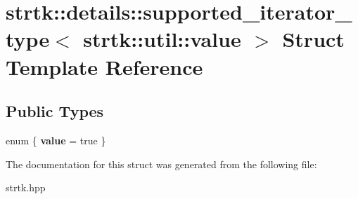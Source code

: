 \hypertarget{structstrtk_1_1details_1_1supported__iterator__type_3_01strtk_1_1util_1_1value_01_4}{\section{strtk\-:\-:details\-:\-:supported\-\_\-iterator\-\_\-type$<$ strtk\-:\-:util\-:\-:value $>$ Struct Template Reference}
\label{structstrtk_1_1details_1_1supported__iterator__type_3_01strtk_1_1util_1_1value_01_4}
}
\subsection*{Public Types}
\begin{DoxyCompactItemize}
\item 
enum \{ {\bfseries value} = true
 \}
\end{DoxyCompactItemize}


The documentation for this struct was generated from the following file\-:\begin{DoxyCompactItemize}
\item 
strtk.\-hpp\end{DoxyCompactItemize}
